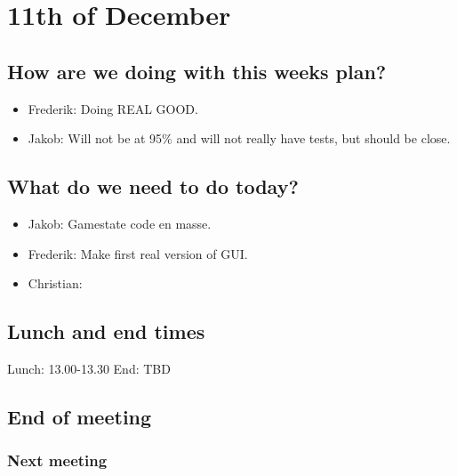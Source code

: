 \section{11th of December}
\subsection{How are we doing with this weeks plan?}
\begin{itemize}
\item Frederik: Doing REAL GOOD.
\item Jakob: Will not be at 95\% and will not really have tests, but should be close.
\end{itemize}

\subsection{What do we need to do today?}
\begin{itemize}
\item Jakob: Gamestate code en masse.
\item Frederik: Make first real version of GUI.
\item Christian:
\end{itemize}

\subsection{Lunch and end times}
Lunch:
13.00-13.30
End:
TBD
\subsection{End of meeting}
\subsubsection{Next meeting}
